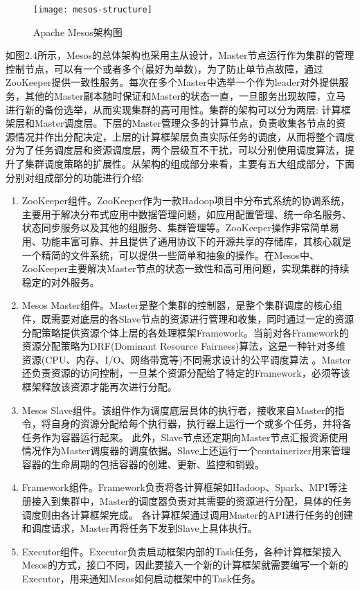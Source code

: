 \begin{figure}[H] %
	\centering
	\texttt{[image: mesos-structure]}
	\caption{Apache Mesos架构图}
	\label{fig:xfig1}
\end{figure}

如图2.4所示，Mesos的总体架构也采用主从设计，Master节点运行作为集群的管理控制节点，可以有一个或者多个(最好为单数)，为了防止单节点故障，通过ZooKeeper提供一致性服务。每次在多个Master中选举一个作为leader对外提供服务，其他的Master副本随时保证和Master的状态一直，一旦服务出现故障，立马进行新的备份选举，从而实现集群的高可用性。集群的架构可以分为两层: 计算框架层和Master调度层。下层的Master管理众多的计算节点，负责收集各节点的资源情况并作出分配决定，上层的计算框架层负责实际任务的调度，从而将整个调度分为了任务调度层和资源调度层，两个层级互不干扰，可以分别使用调度算法，提升了集群调度策略的扩展性。从架构的组成部分来看，主要有五大组成部分，下面分别对组成部分的功能进行介绍:
\begin{enumerate}[1.]
	\item ZooKeeper组件。ZooKeeper作为一款Hadoop项目中分布式系统的协调系统，主要用于解决分布式应用中数据管理问题，如应用配置管理、统一命名服务、状态同步服务以及其他的组服务、集群管理等。ZooKeeper操作非常简单易用、功能丰富可靠、并且提供了通用协议下的开源共享的存储库，其核心就是一个精简的文件系统，可以提供一些简单和抽象的操作。在Mesos中、ZooKeeper主要解决Master节点的状态一致性和高可用问题，实现集群的持续稳定的对外服务。
	\item Mesos Master组件。Master是整个集群的控制器，是整个集群调度的核心组件，既需要对底层的各Slave节点的资源进行管理和收集，同时通过一定的资源分配策略提供资源个体上层的各处理框架Framework。当前对各Framework的资源分配策略为DRF(Dominant Resource Fairness)算法，这是一种针对多维资源(CPU、内存、I/O、网络带宽等)不同需求设计的公平调度算法
	。Master还负责资源的访问控制，一旦某个资源分配给了特定的Framework，必须等该框架释放该资源才能再次进行分配。
	\item Mesos Slave组件。该组件作为调度底层具体的执行者，接收来自Master的指令，将自身的资源分配给每个执行器，执行器上运行一个或多个任务，并将各任务作为容器运行起来。
	此外，Slave节点还定期向Master节点汇报资源使用情况作为Master调度器的调度依据。Slave上还运行一个containerizer用来管理容器的生命周期的包括容器的创建、更新、监控和销毁。
	\item Framework组件。Framework负责将各计算框架如Hadoop、Spark、MPI等注册接入到集群中，Master的调度器负责对其需要的资源进行分配，具体的任务调度则由各计算框架完成。
	各计算框架通过调用Master的API进行任务的创建和调度请求，Master再将任务下发到Slave上具体执行。
	\item Executor组件。Executor负责启动框架内部的Task任务，各种计算框架接入Mesos的方式，接口不同，因此要接入一个新的计算框架就需要编写一个新的Executor，用来通知Mesos如何启动框架中的Task任务。
\end{enumerate}


